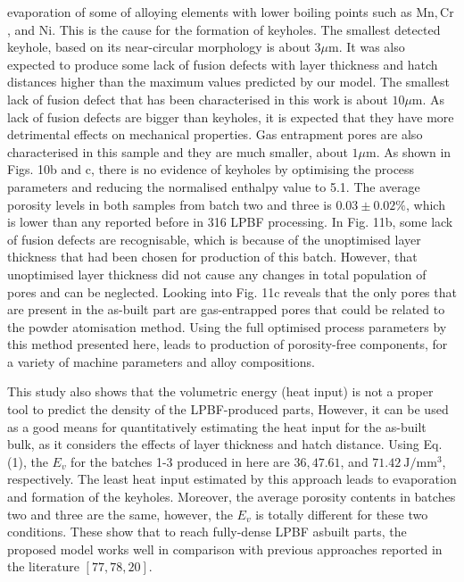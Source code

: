 \documentclass[10pt]{article}
\begin{document}
evaporation of some of alloying elements with lower boiling points such as $\mathrm{Mn}, \mathrm{Cr}$, and Ni. This is the cause for the formation of keyholes. The smallest detected keyhole, based on its near-circular morphology is about $3 \mu \mathrm{m}$. It was also expected to produce some lack of fusion defects with layer thickness and hatch distances higher than the maximum values predicted by our model. The smallest lack of fusion defect that has been characterised in this work is about $10 \mu \mathrm{m}$. As lack of fusion defects are bigger than keyholes, it is expected that they have more detrimental effects on mechanical properties. Gas entrapment pores are also characterised in this sample and they are much smaller, about $1 \mu \mathrm{m}$. As shown in Figs. 10b and c, there is no evidence of keyholes by optimising the process parameters and reducing the normalised enthalpy value to 5.1. The average porosity levels in both samples from batch two and three is $0.03 \pm 0.02 \%$, which is lower than any reported before in 316 LPBF processing. In Fig. 11b, some lack of fusion defects are recognisable, which is because of the unoptimised layer thickness that had been chosen for production of this batch. However, that unoptimised layer thickness did not cause any changes in total population of pores and can be neglected. Looking into Fig. 11c reveals that the only pores that are present in the as-built part are gas-entrapped pores that could be related to the powder atomisation method. Using the full optimised process parameters by this method presented here, leads to production of porosity-free components, for a variety of machine parameters and alloy compositions.

This study also shows that the volumetric energy (heat input) is not a proper tool to predict the density of the LPBF-produced parts, However, it can be used as a good means for quantitatively estimating the heat input for the as-built bulk, as it considers the effects of layer thickness and hatch distance. Using Eq. (1), the $E_{v}$ for the batches 1-3 produced in here are $36,47.61$, and $71.42 \mathrm{~J} / \mathrm{mm}^{3}$, respectively. The least heat input estimated by this approach leads to evaporation and formation of the keyholes. Moreover, the average porosity contents in batches two and three are the same, however, the $E_{v}$ is totally different for these two conditions. These show that to reach fully-dense LPBF asbuilt parts, the proposed model works well in comparison with previous approaches reported in the literature $[77,78,20]$.
\end{document}
